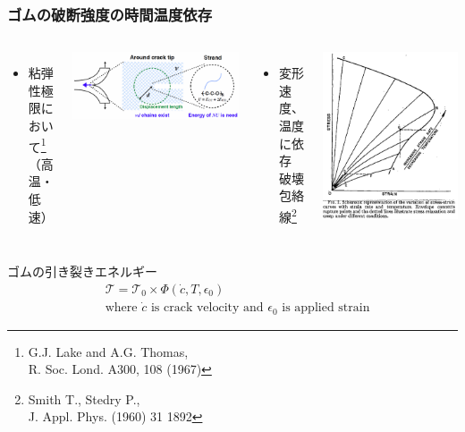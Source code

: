 \documentclass[12pt, dvipdfmx]{beamer}
\begin{document}
\begin{frame}
    \frametitle{ゴムの破断強度の時間温度依存}
	\vspace{-2mm}
    \begin{columns}[T, totalwidth=\textwidth]
    \begin{itemize}
		\item \alert{粘弾性極限において\footnote[1]{
			G.J. Lake and A.G. Thomas, \\R. Soc. Lond. A300, 108 (1967)
		}}\\
		（高温・低速）
	\end{itemize}
    \includegraphics[width=\textwidth]{Lake_Thomas.png}
    
    \begin{itemize}
		\item 変形速度、温度に依存\\
		\alert{破壊包絡線\footnote[2]{
			Smith T., Stedry P., \\J. Appl. Phys. (1960) 31 1892
		}}
	\end{itemize}
	\begin{center}
		\includegraphics[width=.4\textwidth]{Time_Temp_3.png}
	\end{center}
    \end{columns}
    \begin{alertblock}{ゴムの引き裂きエネルギー}
		\vspace{-2mm}
		\begin{align*}
			&\mathcal{T}=\mathcal{T}_0 \times \Phi(\dot{c}, T, \epsilon_0) \\
			&\text{where $\dot{c}$ is crack velocity and $\epsilon_0$ is applied strain}
		\end{align*}
    \end{alertblock}
\end{frame}
\end{document}
